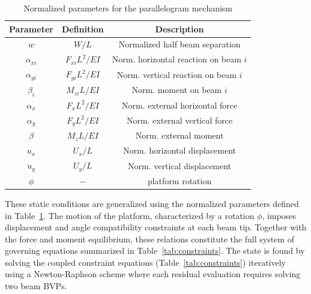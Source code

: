 \documentclass[colorlinks,upint,subscriptcorrection,varvw,hyphenate,balance]{asmeconf} %
\begin{document}
\begin{table}[ht]
\centering
\caption{Normalized parameters for the parallelogram mechanism}
\label{tab:para_normalization}
\begin{tabular}{@{}ccc@{}}
\toprule
\textbf{Parameter} & \textbf{Definition} & \textbf{Description} \\
\midrule
$w$ & $W/L$ & Normalized half beam separation \\
$\alpha_{xi}$ & $F_{xi} L^2 / EI$ & Norm. horizontal reaction on beam $i$ \\
$\alpha_{yi}$ & $F_{yi} L^2 / EI$ & Norm. vertical reaction on beam $i$ \\
$\beta_i$ & $M_{zi} L / EI$ & Norm. moment on beam $i$ \\
$\alpha_x$ & $F_x L^2 / EI$ & Norm. external horizontal force \\
$\alpha_y$ & $F_y L^2 / EI$ & Norm. external vertical force \\
$\beta$ & $M_z L / EI$ & Norm. external moment \\
$u_x$ & $U_x/L$ & Norm. horizontal displacement \\
$u_y$ & $U_y/L$ & Norm. vertical displacement \\
$\phi$ & $-$ & platform rotation \\
\bottomrule
\end{tabular}
\end{table}

These static conditions are generalized using the normalized parameters defined in Table~\ref{tab:para_normalization}. The motion of the platform, characterized by a rotation $\phi$, imposes displacement and angle compatibility constraints at each beam tip. Together with the force and moment equilibrium, these relations constitute the full system of governing equations summarized in Table~\ref{tab:constraints}. The state is found by solving the coupled constraint equations (Table~\ref{tab:constraints}) iteratively using a Newton-Raphson scheme where each residual evaluation requires solving two beam BVPs.
\end{document}
